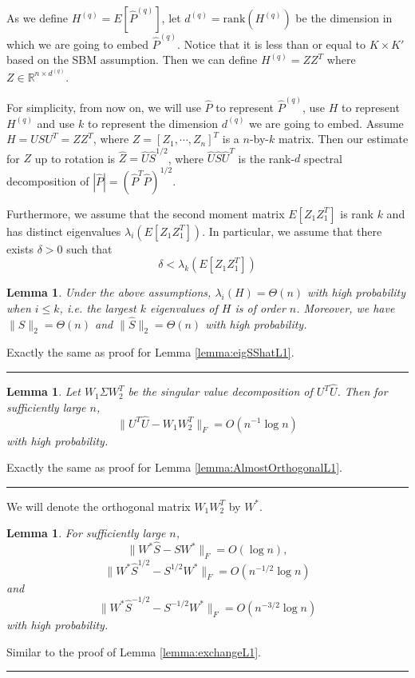 \documentclass[a4paper]{article}
\newenvironment{proof}{{\bf Proof:  }}{\hfill\rule{2mm}{2mm}}
\newtheorem{lemma}[fact]{Lemma}
\renewcommand{\hat}{\widehat}
\begin{document}
As we define $H^{(q)} = E[\hat{P}^{(q)}]$, let $d^{(q)} = \mathrm{rank}(H^{(q)})$ be the dimension in which we are going to embed $\hat{P}^{(q)}$. Notice that it is less than or equal to $K\times K'$ based on the SBM assumption. Then we can define $H^{(q)} = Z Z^T$ where $Z \in \mathbb{R}^{n \times d^{(q)}}$.

For simplicity, from now on, we will use $\hat{P}$ to represent $\hat{P}^{(q)}$, use $H$ to represent $H^{(q)}$ and use $k$ to represent the dimension $d^{(q)}$ we are going to embed. Assume $H = U S U^T = Z Z^T$, where $Z = [Z_1, \cdots, Z_n]^T$ is a $n$-by-$k$ matrix. Then our estimate for $Z$ up to rotation is $\hat{Z} = \hat{U} \hat{S}^{1/2}$, where $\hat{U} \hat{S} \hat{U}^T$ is the rank-$d$ spectral decomposition of $|\hat{P}| = (\hat{P}^T \hat{P})^{1/2}$.

Furthermore, we assume that the second moment matrix $E[Z_1 Z_1^T]$ is rank $k$ and has distinct eigenvalues $\lambda_i(E[Z_1 Z_1^T])$. In particular, we assume that there exists $\delta > 0$ such that
\[
	\delta < \lambda_k(E[Z_1 Z_1^T])
\]

\begin{lemma}
\label{lemma:eigSShat}
Under the above assumptions, $\lambda_i(H) = \Theta(n)$ with high probability when $i \le k$, i.e. the largest $k$ eigenvalues of $H$ is of order $n$. Moreover, we have $\| S \|_2 = \Theta(n)$ and $\| \hat{S} \|_2 = \Theta(n)$ with high probability.
\end{lemma}
\begin{proof}
Exactly the same as proof for Lemma \ref{lemma:eigSShatL1}.
\end{proof}

\begin{lemma}
\label{lemma:AlmostOrthogonal}
Let $W_1 \Sigma W_2^T$ be the singular value decomposition of $U^T \hat{U}$. Then for sufficiently large $n$, 
\[
	\| U^T \hat{U} - W_1 W_2^T \|_F = O(n^{-1} \log n)
\]
with high probability.
\end{lemma}
\begin{proof}
Exactly the same as proof for Lemma \ref{lemma:AlmostOrthogonalL1}.
\end{proof}

We will denote the orthogonal matrix $W_1 W_2^T$ by $W^*$.
\begin{lemma}
\label{lemma:exchange}
For sufficiently large $n$,
\[
	\| W^* \hat{S} - S W^* \|_F = O(\log n),
\]
\[
	\|W^* \hat{S}^{1/2} - S^{1/2} W^* \|_F = O(n^{-1/2} \log n)
\]
and
\[
	\| W^* \hat{S}^{-1/2} - S^{-1/2} W^* \|_F = O(n^{-3/2} \log n)
\]
with high probability.
\end{lemma}
\begin{proof}
Similar to the proof of Lemma \ref{lemma:exchangeL1}.
\end{proof}
\end{document}
